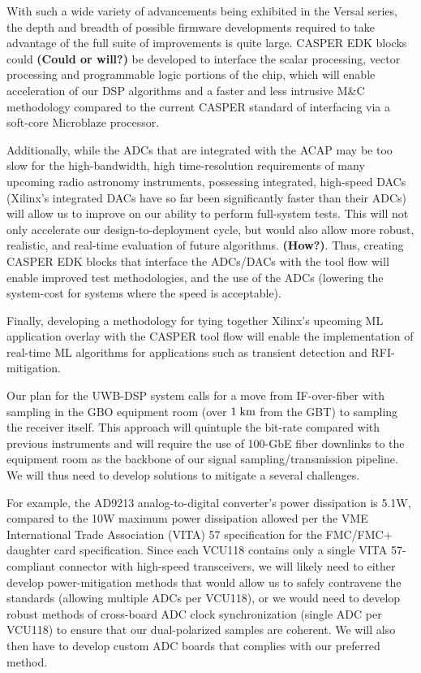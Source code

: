 \documentclass[10pt]{myNSF}
\begin{document}
With such a wide variety of advancements being exhibited in the Versal
series, the depth and breadth of possible firmware developments
required to take advantage of the full suite of improvements is quite
large. CASPER EDK blocks could \textbf{(Could or will?)} be developed
to interface the scalar processing, vector processing and programmable
logic portions of the chip, which will enable acceleration of our DSP
algorithms and a faster and less intrusive M\&C methodology compared to
the current CASPER standard of interfacing via a soft-core Microblaze
processor.

Additionally, while the ADCs that are integrated with the ACAP may be
too slow for the high-bandwidth, high time-resolution requirements of
many upcoming radio astronomy instruments, possessing integrated,
high-speed DACs (Xilinx’s integrated DACs have so far been
significantly faster than their ADCs) will allow us to improve on our
ability to perform full-system tests.  This will not only accelerate
our design-to-deployment cycle, but would also allow more robust,
realistic, and real-time evaluation of future algorithms.
\textbf{(How?)}.  Thus, creating CASPER EDK blocks that interface the
ADCs/DACs with the tool flow will enable improved test methodologies,
and the use of the ADCs (lowering the system-cost for systems where
the speed is acceptable).

Finally, developing a methodology for tying together Xilinx’s upcoming
ML application overlay with the CASPER tool flow will enable the
implementation of real-time ML algorithms for applications such as
transient detection and RFI-mitigation.


Our plan for the UWB-DSP system calls for a move from IF-over-fiber
with sampling in the GBO equipment room (over $1\; \textrm{km}$ from the GBT)
to sampling the receiver itself.  This approach will quintuple the
bit-rate compared with previous instruments and will require the use
of 100-GbE fiber downlinks to the equipment room as the backbone of
our signal sampling/transmission pipeline.  We will thus need to
develop solutions to mitigate a several challenges.

For example, the AD9213 analog-to-digital converter's power
dissipation is 5.1W, compared to the 10W maximum power dissipation
allowed per the VME International Trade Association (VITA) 57
specification for the FMC/FMC+ daughter card specification. Since each
VCU118 contains only a single VITA 57-compliant connector with
high-speed transceivers, we will likely need to either develop
power-mitigation methods that would allow us to safely contravene the
standards (allowing multiple ADCs per VCU118), or we would need to
develop robust methods of cross-board ADC clock synchronization
(single ADC per VCU118) to ensure that our dual-polarized samples are
coherent. We will also then have to develop custom ADC boards that
complies with our preferred method.
\end{document}
